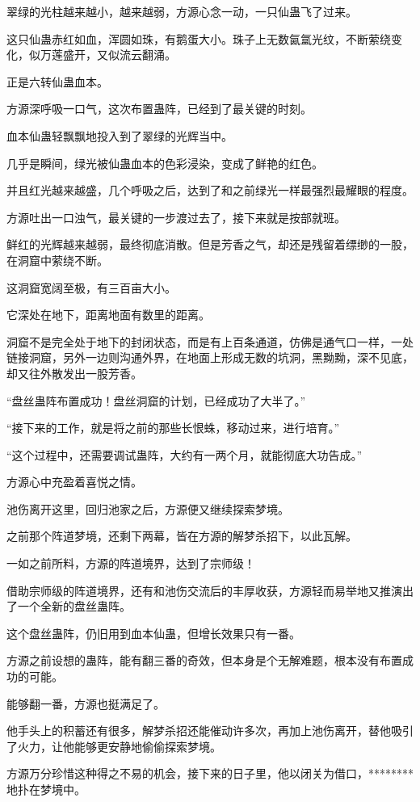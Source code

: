 \begin{this_body}
翠绿的光柱越来越小，越来越弱，方源心念一动，一只仙蛊飞了过来。

这只仙蛊赤红如血，浑圆如珠，有鹅蛋大小。珠子上无数氤氲光纹，不断萦绕变化，似万莲盛开，又似流云翻涌。

正是六转仙蛊血本。

方源深呼吸一口气，这次布置蛊阵，已经到了最关键的时刻。

血本仙蛊轻飘飘地投入到了翠绿的光辉当中。

几乎是瞬间，绿光被仙蛊血本的色彩浸染，变成了鲜艳的红色。

并且红光越来越盛，几个呼吸之后，达到了和之前绿光一样最强烈最耀眼的程度。

方源吐出一口浊气，最关键的一步渡过去了，接下来就是按部就班。

鲜红的光辉越来越弱，最终彻底消散。但是芳香之气，却还是残留着缥缈的一股，在洞窟中萦绕不断。

这洞窟宽阔至极，有三百亩大小。

它深处在地下，距离地面有数里的距离。

洞窟不是完全处于地下的封闭状态，而是有上百条通道，仿佛是通气口一样，一处链接洞窟，另外一边则沟通外界，在地面上形成无数的坑洞，黑黝黝，深不见底，却又往外散发出一股芳香。

“盘丝蛊阵布置成功！盘丝洞窟的计划，已经成功了大半了。”

“接下来的工作，就是将之前的那些长恨蛛，移动过来，进行培育。”

“这个过程中，还需要调试蛊阵，大约有一两个月，就能彻底大功告成。”

方源心中充盈着喜悦之情。

池伤离开这里，回归池家之后，方源便又继续探索梦境。

之前那个阵道梦境，还剩下两幕，皆在方源的解梦杀招下，以此瓦解。

一如之前所料，方源的阵道境界，达到了宗师级！

借助宗师级的阵道境界，还有和池伤交流后的丰厚收获，方源轻而易举地又推演出了一个全新的盘丝蛊阵。

这个盘丝蛊阵，仍旧用到血本仙蛊，但增长效果只有一番。

方源之前设想的蛊阵，能有翻三番的奇效，但本身是个无解难题，根本没有布置成功的可能。

能够翻一番，方源也挺满足了。

他手头上的积蓄还有很多，解梦杀招还能催动许多次，再加上池伤离开，替他吸引了火力，让他能够更安静地偷偷探索梦境。

方源万分珍惜这种得之不易的机会，接下来的日子里，他以闭关为借口，********地扑在梦境中。


\end{this_body}
